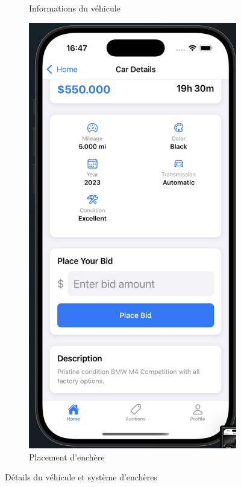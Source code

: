 \begin{figure}[H]
\begin{subfigure}[b]{0.48\textwidth}
        \caption{Informations du véhicule}
        \label{fig:car-details1}
    \end{subfigure}
    \hfill
    \begin{subfigure}[b]{0.48\textwidth}
        \includegraphics[width=\textwidth]{images/auction details 2.png}
        \caption{Placement d'enchère}
        \label{fig:car-details2}
    \end{subfigure}
    \caption{Détails du véhicule et système d'enchères}
    \label{fig:car-details}
\end{figure}


